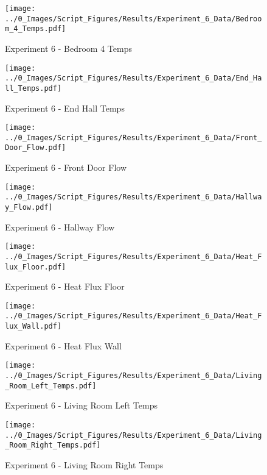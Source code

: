 	\begin{figure}[H]
		\centering
		\texttt{[image: ../0\_Images/Script\_Figures/Results/Experiment\_6\_Data/Bedroom\_4\_Temps.pdf]}
		\caption[]{Experiment 6 - Bedroom 4 Temps}
	\end{figure}
 
	\clearpage

	\begin{figure}[H]
		\centering
		\texttt{[image: ../0\_Images/Script\_Figures/Results/Experiment\_6\_Data/End\_Hall\_Temps.pdf]}
		\caption[]{Experiment 6 - End Hall Temps}
	\end{figure}
 

	\begin{figure}[H]
		\centering
		\texttt{[image: ../0\_Images/Script\_Figures/Results/Experiment\_6\_Data/Front\_Door\_Flow.pdf]}
		\caption[]{Experiment 6 - Front Door Flow}
	\end{figure}
 
	\clearpage

	\begin{figure}[H]
		\centering
		\texttt{[image: ../0\_Images/Script\_Figures/Results/Experiment\_6\_Data/Hallway\_Flow.pdf]}
		\caption[]{Experiment 6 - Hallway Flow}
	\end{figure}
 

	\begin{figure}[H]
		\centering
		\texttt{[image: ../0\_Images/Script\_Figures/Results/Experiment\_6\_Data/Heat\_Flux\_Floor.pdf]}
		\caption[]{Experiment 6 - Heat Flux Floor}
	\end{figure}
 
	\clearpage

	\begin{figure}[H]
		\centering
		\texttt{[image: ../0\_Images/Script\_Figures/Results/Experiment\_6\_Data/Heat\_Flux\_Wall.pdf]}
		\caption[]{Experiment 6 - Heat Flux Wall}
	\end{figure}
 

	\begin{figure}[H]
		\centering
		\texttt{[image: ../0\_Images/Script\_Figures/Results/Experiment\_6\_Data/Living\_Room\_Left\_Temps.pdf]}
		\caption[]{Experiment 6 - Living Room Left Temps}
	\end{figure}
 
	\clearpage

	\begin{figure}[H]
		\centering
		\texttt{[image: ../0\_Images/Script\_Figures/Results/Experiment\_6\_Data/Living\_Room\_Right\_Temps.pdf]}
		\caption[]{Experiment 6 - Living Room Right Temps}
	\end{figure}
 

